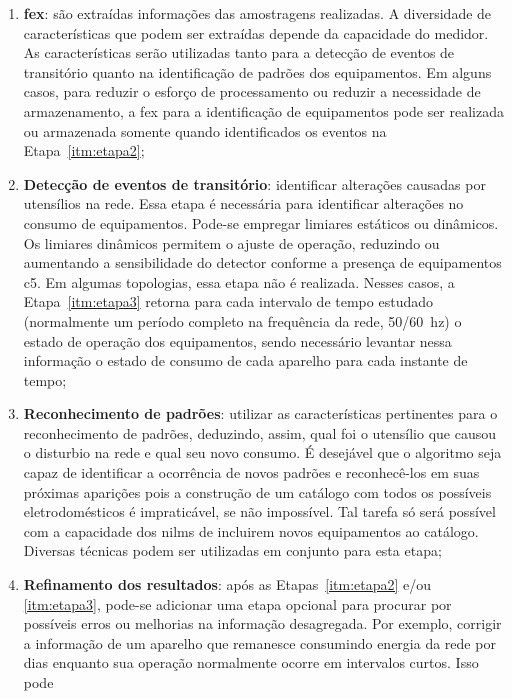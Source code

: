 \begin{enumerate}[label={Etapa} \arabic* - ,ref=\arabic*,align=left]
\item\label{itm:etapa1} \textbf{\gls{fex}}: são extraídas
informações das amostragens realizadas. A diversidade de
características que podem ser extraídas depende da capacidade do
medidor. As características serão utilizadas tanto para a detecção de
eventos de transitório quanto na identificação de padrões dos
equipamentos. Em alguns casos, para reduzir o esforço de processamento
ou reduzir a necessidade de armazenamento, a \gls{fex} para a
identificação de equipamentos pode ser realizada ou armazenada somente
quando identificados os eventos na Etapa~\ref{itm:etapa2};
\item\label{itm:etapa2}\textbf{Detecção de eventos de
transitório}: identificar alterações causadas por utensílios na rede.
Essa etapa é necessária para identificar alterações no consumo de
equipamentos. Pode-se empregar limiares estáticos ou dinâmicos. Os
limiares dinâmicos permitem o ajuste de operação, reduzindo ou
aumentando a sensibilidade do detector conforme a presença de
equipamentos \acrshort{c5}. Em algumas topologias, essa etapa não é
realizada. Nesses casos, a Etapa~\ref{itm:etapa3} retorna para cada
intervalo de tempo estudado (normalmente um período completo na frequência
da rede, 50/60~\acrshort{hz}) o estado de operação dos equipamentos,
sendo necessário levantar nessa informação o estado de consumo de cada
aparelho para cada instante de tempo;
\item\label{itm:etapa3}\textbf{Reconhecimento de padrões}: utilizar as
características pertinentes para o reconhecimento de padrões,
deduzindo, assim, qual foi o utensílio que causou o disturbio na rede
e qual seu novo consumo. É desejável que o algoritmo seja capaz de identificar
a ocorrência de novos padrões e reconhecê-los em suas próximas 
aparições pois a construção de um catálogo com todos os possíveis
eletrodomésticos é impraticável, se não impossível. Tal tarefa só será
possível com a capacidade dos \glspl{nilm} de incluirem novos
equipamentos ao catálogo. Diversas técnicas podem ser utilizadas em
conjunto para esta etapa;
\item\label{itm:etapa4}\textbf{Refinamento dos resultados}: após as
Etapas~\ref{itm:etapa2} e/ou \ref{itm:etapa3}, pode-se adicionar uma
etapa opcional para procurar por possíveis erros ou melhorias na
informação desagregada. Por exemplo, corrigir a informação de um
aparelho que remanesce consumindo energia da rede por dias enquanto
sua operação normalmente ocorre em intervalos curtos. Isso pode

\end{enumerate}
